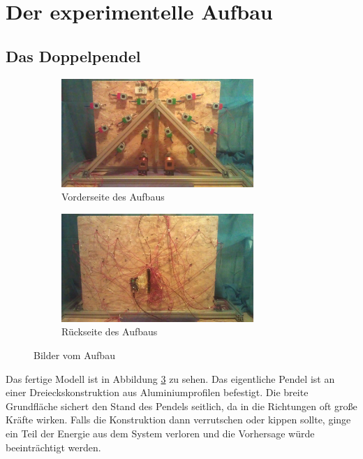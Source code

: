 
\section{Der experimentelle Aufbau}

\subsection{Das Doppelpendel}

\begin{figure}[bht]
  \centering
  \begin{subfigure}{\textwidth}
    \centering
    \includegraphics[width=0.8\textwidth]{images/real_front.jpg}
    \caption{Vorderseite des Aufbaus}
    \label{fig:front}
  \end{subfigure}
  \begin{subfigure}{\textwidth}
    \centering
    \includegraphics[width=0.8\textwidth]{images/real_back.jpg}
    \caption{Rückseite des Aufbaus}
    \label{fig:back}
  \end{subfigure}
  \caption{Bilder vom Aufbau}
  \label{fig:aufbau}
\end{figure}

Das fertige Modell ist in Abbildung \ref{fig:aufbau} zu sehen.
Das eigentliche Pendel ist an einer Dreieckskonstruktion aus Aluminiumprofilen befestigt.
Die breite Grundfläche sichert den Stand des Pendels seitlich, da in die Richtungen oft große Kräfte wirken.
Falls die Konstruktion dann verrutschen oder kippen sollte, ginge ein Teil der Energie aus dem System verloren und die Vorhersage würde beeinträchtigt werden.

